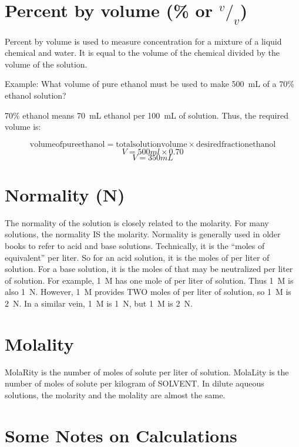 \section{Percent by volume (\% or $^v/_v$)}

Percent by volume is used to measure concentration for a mixture of a liquid chemical and water. It is equal to the volume of the chemical divided by the volume of the solution.

Example: What volume of pure ethanol must be used to make 500~mL of a 70\% ethanol solution?

70\% ethanol means 70~mL ethanol per 100~mL of solution. Thus, the required volume is:

\[ \mathrm{volume of pure ethanol} = \mathrm{total solution volume} \times \mathrm{desired fraction ethanol} \]
\[ V = 500ml \times 0.70 \]
\[ V = 350 mL \] 

\section{Normality (N)}

The normality of the solution is closely related to the molarity. For many solutions, the normality IS the molarity. Normality is generally used in older books to refer to acid and base solutions. Technically, it is the ``moles of equivalent'' per liter. So for an acid solution, it is the moles of  per liter of solution. For a base solution, it is the moles of  that may be neutralized per liter of solution. For example, 1~M  has one mole of  per liter of solution. Thus 1~M  is also 1~N. However, 1~M  provides TWO moles of  per liter of solution, so 1~M  is 2~N. In a similar vein, 1~M  is 1~N, but 1~M  is 2~N.

\section{Molality}

MolaRity is the number of moles of solute per liter of solution. MolaLity is the number of moles of solute per kilogram of SOLVENT. In dilute aqueous solutions, the molarity and the molality are almost the same.

\section{Some Notes on Calculations}

